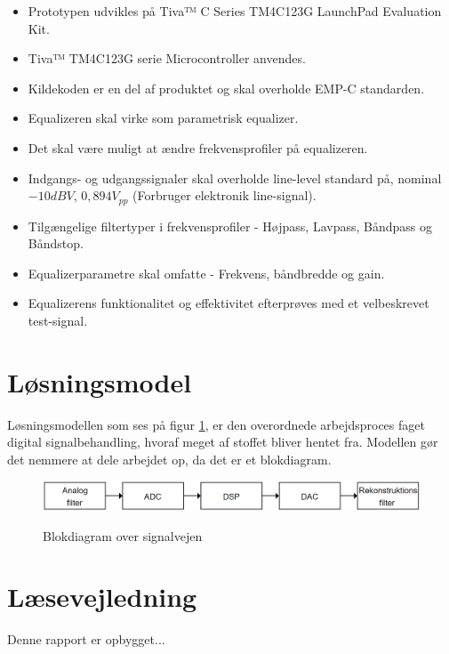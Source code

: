 \begin{itemize}
	\item Prototypen udvikles på Tiva™ C Series TM4C123G LaunchPad Evaluation Kit.
	\item Tiva™ TM4C123G serie Microcontroller anvendes.
	\item Kildekoden er en del af produktet og skal overholde EMP-C standarden.
	\item Equalizeren skal virke som parametrisk equalizer.
	\item Det skal være muligt at ændre frekvensprofiler på equalizeren.
	\item Indgangs- og udgangssignaler skal overholde line-level standard på, nominal $-10 dBV$, $0,894 V_{pp}$ (Forbruger elektronik line-signal).
	\item Tilgængelige filtertyper i frekvensprofiler - Højpass, Lavpass, Båndpass og Båndstop.
	\item Equalizerparametre skal omfatte - Frekvens, båndbredde og gain.
	\item Equalizerens funktionalitet og effektivitet efterprøves med et velbeskrevet test-signal.
\end{itemize}

\section{Løsningsmodel}
Løsningsmodellen som ses på figur \ref{fig:blokdiagram}, er den overordnede arbejdsproces faget digital signalbehandling, hvoraf meget af stoffet bliver hentet fra. Modellen gør det nemmere at dele arbejdet op, da det er et blokdiagram.

\begin{figure}[h]
	\centering
	\includegraphics[width=15cm]{billeder/DSP_blokdiagram}\label{fig:blokdiagram}
	\caption{Blokdiagram over signalvejen}
\end{figure}

\section{Læsevejledning}
Denne rapport er opbygget...
